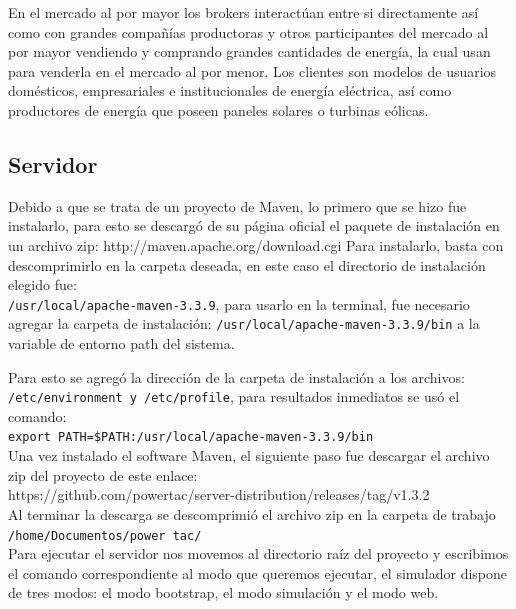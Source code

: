 En el mercado al por mayor los brokers interactúan entre si directamente así como con grandes compañías productoras y otros participantes del mercado al por mayor vendiendo y comprando grandes cantidades de energía, la cual usan para venderla en el mercado al por menor. Los clientes son modelos de usuarios domésticos, empresariales e institucionales de energía eléctrica, así como productores de energía que poseen paneles solares o turbinas eólicas.

\subsection{Servidor}

Debido a que se trata de un proyecto de Maven, lo primero que se hizo fue instalarlo, para esto se descargó de su página oficial el paquete de instalación en un archivo zip: \textsf{http://maven.apache.org/download.cgi}
Para instalarlo, basta con descomprimirlo en la carpeta deseada, en este caso el directorio de instalación elegido fue:\\ \texttt{/usr/local/apache-maven-3.3.9}, 
para usarlo en la terminal, fue necesario agregar la carpeta de instalación: \texttt{/usr/local/apache-maven-3.3.9/bin} 
a la variable de entorno path del sistema.

Para esto se agregó la dirección de la carpeta de instalación a los archivos:\\
\texttt{/etc/environment y /etc/profile}, para resultados inmediatos se usó el comando:\\
\texttt{export PATH=\$PATH:/usr/local/apache-maven-3.3.9/bin}\\

Una vez instalado el software Maven, el siguiente paso fue descargar el archivo zip del proyecto de este enlace:\\ \textsf{https://github.com/powertac/server-distribution/releases/tag/v1.3.2}\\
Al terminar la descarga se descomprimió el archivo zip en la carpeta de trabajo\\
\texttt{/home/Documentos/power tac/} \\
Para ejecutar el servidor nos movemos al directorio raíz del proyecto y escribimos el comando correspondiente al modo que queremos ejecutar, el simulador dispone de tres modos: el modo bootstrap, el modo simulación y el modo web.

